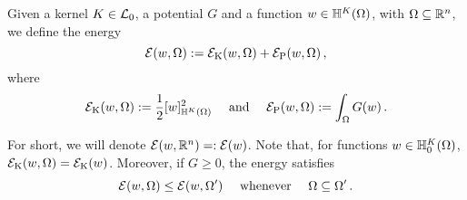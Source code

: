 \begin{definition}
\label{Def:Energy}
Given a kernel $K \in \mathcal{L}_0$, a potential $G$ and a function $w\in \mathbb{H}^K(\Omega)$, with $\Omega\subseteq \mathbb{R}^{n}$, we define the energy
$$
\mathcal{E}(w, \Omega) := \mathcal{E}_\mathrm{K}(w,\Omega) + \mathcal{E}_\mathrm{P}(w,\Omega)\,,
$$
where
$$
\mathcal{E}_\mathrm{K}(w, \Omega) := \dfrac{1}{2} [w]^2_{\mathbb{H}^K(\Omega)} \quad \text{ and } \quad  \mathcal{E}_\mathrm{P}(w, \Omega) := \int_{\Omega} G(w)
\,.
$$
\end{definition}
For short, we will denote $\mathcal{E}(w, \mathbb{R}^n) =: \mathcal{E}(w)$. Note that, for functions $w\in \mathbb{H}^K_0(\Omega)$, $\mathcal{E}_\mathrm{K}(w,\Omega) = \mathcal{E}_\mathrm{K}(w)$. Moreover, if $G\geq 0$, the energy satisfies
$$
\mathcal{E}(w, \Omega) \leq \mathcal{E}(w, \Omega') \quad \text{ whenever } \quad \Omega \subseteq \Omega'\,.
$$




